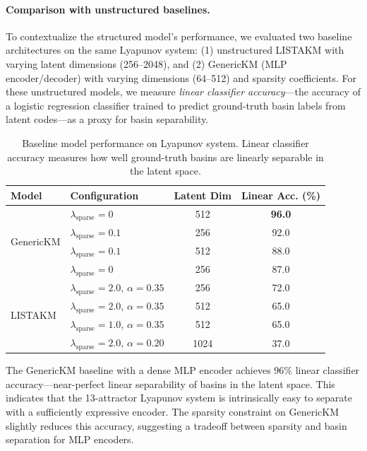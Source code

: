 \paragraph{Comparison with unstructured baselines.}
To contextualize the structured model's performance, we evaluated two baseline architectures on the same Lyapunov system: (1) unstructured LISTAKM with varying latent dimensions (256--2048), and (2) GenericKM (MLP encoder/decoder) with varying dimensions (64--512) and sparsity coefficients. For these unstructured models, we measure \emph{linear classifier accuracy}---the accuracy of a logistic regression classifier trained to predict ground-truth basin labels from latent codes---as a proxy for basin separability.

\begin{table}[h]
\centering
\caption{Baseline model performance on Lyapunov system. Linear classifier accuracy measures how well ground-truth basins are linearly separable in the latent space.}
\label{tab:baseline-comparison}
\begin{tabular}{llcc}
\toprule
\textbf{Model} & \textbf{Configuration} & \textbf{Latent Dim} & \textbf{Linear Acc. (\%)}\\
\midrule
\multirow{4}{*}{GenericKM}
& $\lambda_{\text{sparse}} = 0$ & 512 & \textbf{96.0} \\
& $\lambda_{\text{sparse}} = 0.1$ & 256 & 92.0 \\
& $\lambda_{\text{sparse}} = 0.1$ & 512 & 88.0 \\
& $\lambda_{\text{sparse}} = 0$ & 256 & 87.0 \\
\midrule
\multirow{4}{*}{LISTAKM}
& $\lambda_{\text{sparse}} = 2.0$, $\alpha = 0.35$ & 256 & 72.0 \\
& $\lambda_{\text{sparse}} = 2.0$, $\alpha = 0.35$ & 512 & 65.0 \\
& $\lambda_{\text{sparse}} = 1.0$, $\alpha = 0.35$ & 512 & 65.0 \\
& $\lambda_{\text{sparse}} = 2.0$, $\alpha = 0.20$ & 1024 & 37.0 \\
\bottomrule
\end{tabular}
\end{table}

The GenericKM baseline with a dense MLP encoder achieves 96\% linear classifier accuracy---near-perfect linear separability of basins in the latent space. This indicates that the 13-attractor Lyapunov system is intrinsically easy to separate with a sufficiently expressive encoder. The sparsity constraint on GenericKM slightly reduces this accuracy, suggesting a tradeoff between sparsity and basin separation for MLP encoders.

